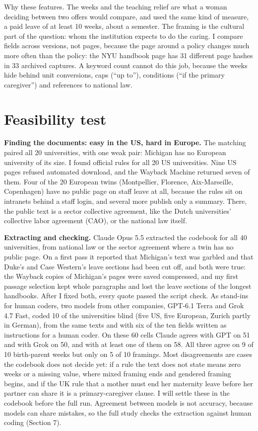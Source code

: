 \documentclass[10pt,twocolumn]{article}
\begin{document}
Why these features. The weeks and the teaching relief are what a woman deciding between two offers would compare, and \citet{morgan2021} used the same kind of measure, a paid leave of at least 10 weeks, about a semester. The framing is the cultural part of the question: whom the institution expects to do the caring. I compare fields across versions, not pages, because the page around a policy changes much more often than the policy: the NYU handbook page has 31 different page hashes in 33 archived captures. A keyword count cannot do this job, because the weeks hide behind unit conversions, caps (``up to''), conditions (``if the primary caregiver'') and references to national law.

\section{Feasibility test}
\textbf{Finding the documents: easy in the US, hard in Europe.} The matching paired all 20 universities, with one weak pair: Michigan has no European university of its size. I found official rules for all 20 US universities. Nine US pages refused automated download, and the Wayback Machine returned seven of them. Four of the 20 European twins (Montpellier, Florence, Aix-Marseille, Copenhagen) have no public page on staff leave at all, because the rules sit on intranets behind a staff login, and several more publish only a summary. There, the public text is a sector collective agreement, like the Dutch universities' collective labor agreement (CAO), or the national law itself.

\textbf{Extracting and checking.} Claude Opus 5.5 extracted the codebook for all 40 universities, from national law or the sector agreement where a twin has no public page. On a first pass it reported that Michigan's text was garbled and that Duke's and Case Western's leave sections had been cut off, and both were true: the Wayback copies of Michigan's pages were saved compressed, and my first passage selection kept whole paragraphs and lost the leave sections of the longest handbooks. After I fixed both, every quote passed the script check. As stand-ins for human coders, two models from other companies, GPT-6.1 Terra and Grok 4.7 Fast, coded 10 of the universities blind (five US, five European, Zurich partly in German), from the same texts and with six of the ten fields written as instructions for a human coder. On these 60 cells Claude agrees with GPT on 51 and with Grok on 50, and with at least one of them on 58. All three agree on 9 of 10 birth-parent weeks but only on 5 of 10 framings. Most disagreements are cases the codebook does not decide yet: if a rule the text does not state means zero weeks or a missing value, where mixed framing ends and gendered framing begins, and if the UK rule that a mother must end her maternity leave before her partner can share it is a primary-caregiver clause. I will settle these in the codebook before the full run. Agreement between models is not accuracy, because models can share mistakes, so the full study checks the extraction against human coding (Section 7).
\end{document}
